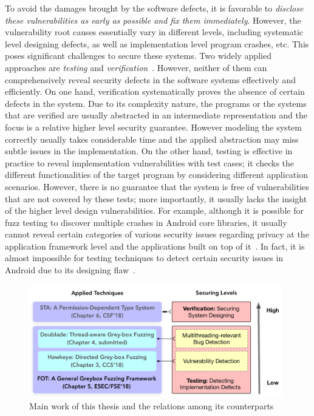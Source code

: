 To avoid the damages brought by the software defects, it is favorable to \emph{disclose these vulnerabilities as early as possible and fix them immediately}. However, the vulnerability root causes essentially vary in different levels, including systematic level designing defects, as well as implementation level program crashes, etc. This poses significant challenges to secure these systems. Two widely applied approaches are \emph{testing} and \emph{verification}~\cite{meng-csur,anna-ijcnn16,Hailpern:2002:SDT:1660992.1660994,Felderer:2016:MST:2904681.2904685,mc-at}. However, neither of them can comprehensively reveal security defects in the software systems effectively and efficiently. On one hand, verification systematically proves the absence of certain defects in the system. Due to its complexity nature, the programs or the systems that are verified are usually abstracted in an intermediate representation and the focus is a relative higher level security guarantee. However modeling the system correctly usually takes considerable time and the applied abstraction may miss subtle issues in the implementation. On the other hand, testing is effective in practice to reveal implementation vulnerabilities with test cases; it checks the different functionalities of the target program by considering different application scenarios. However, there is no guarantee that the system is free of vulnerabilities that are not covered by these tests; more importantly, it usually lacks the insight of the higher level design vulnerabilities. For example, although it is possible for fuzz testing to discover multiple crashes in Android core libraries, it usually cannot reveal certain categories of various security issues regarding privacy at the application framework level and the applications built on top of it~\cite{Enck:2009:UAS:1512148.1512324,Ernst:2014}. In fact, it is almost impossible for testing techniques to detect certain security issues in Android due to its designing flaw~\cite{url:android-flaw}.

\begin{figure}[t]
        \begin{center}
                \includegraphics[width=0.98\textwidth]{res/contributions_new}
                \caption{Main work of this thesis and the relations among its counterparts}
                \label{fig:works}
        \end{center}
\end{figure}


